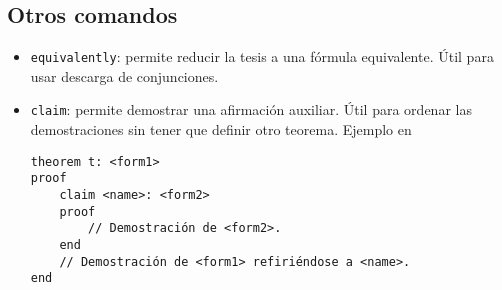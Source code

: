 \subsection{Otros comandos}

\begin{itemize}
    \item \lstinline{equivalently}: permite reducir la tesis a una fórmula
    equivalente. Útil para usar descarga de conjunciones.
    
    

    \item \lstinline{claim}: permite demostrar una afirmación auxiliar. Útil
    para ordenar las demostraciones sin tener que definir otro teorema. Ejemplo
    en 

    \begin{lstlisting}[numbers=none]
theorem t: <form1>
proof
    claim <name>: <form2>
    proof
        // Demostración de <form2>.
    end
    // Demostración de <form1> refiriéndose a <name>.
end
    \end{lstlisting}
\end{itemize}
